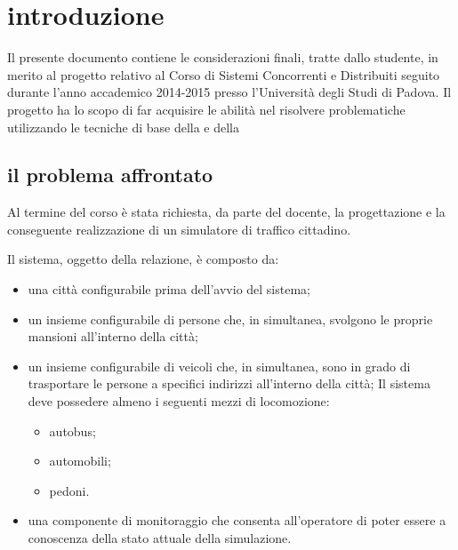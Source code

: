 %
\chapter*{introduzione}
\label{introduzione}
Il presente documento contiene le considerazioni finali, tratte dallo studente, in merito al progetto relativo al Corso di Sistemi Concorrenti e Distribuiti seguito durante l'anno accademico 2014-2015 presso l'Università degli Studi di Padova. Il progetto ha lo scopo di far acquisire le abilità nel risolvere problematiche utilizzando le tecniche di base della  e della 

\section*{il problema affrontato}
\label{introduzione-il-problema-affrontato}
Al termine del corso è stata richiesta, da parte del docente, la progettazione e la conseguente realizzazione di un simulatore di traffico cittadino.

Il sistema, oggetto della relazione, è composto da:

\begin{itemize}
\item{una città  configurabile prima dell'avvio del sistema;}
\item{un insieme configurabile di persone che, in simultanea, svolgono le proprie mansioni all'interno della città;}
\item{un insieme configurabile di veicoli che, in simultanea, sono in grado di trasportare le persone a specifici indirizzi all'interno della città; Il sistema deve possedere almeno i seguenti mezzi di locomozione:}
\begin{itemize}
\item{autobus;}
\item{automobili;}
\item{pedoni.}
\end{itemize}
\item{una componente di monitoraggio che consenta all'operatore di poter essere a conoscenza della stato attuale della simulazione.}
\end{itemize}

